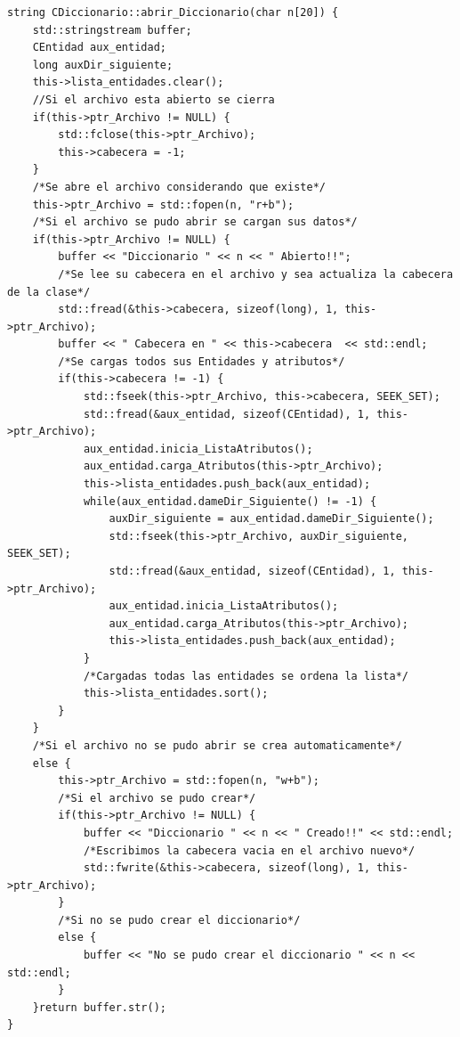 \newpage
{}
\begin{lstlisting}[frame=single]
string CDiccionario::abrir_Diccionario(char n[20]) {
    std::stringstream buffer;
    CEntidad aux_entidad;
    long auxDir_siguiente;
    this->lista_entidades.clear();
    //Si el archivo esta abierto se cierra
    if(this->ptr_Archivo != NULL) {
        std::fclose(this->ptr_Archivo);
        this->cabecera = -1;
    }
    /*Se abre el archivo considerando que existe*/
    this->ptr_Archivo = std::fopen(n, "r+b");
    /*Si el archivo se pudo abrir se cargan sus datos*/
    if(this->ptr_Archivo != NULL) {
        buffer << "Diccionario " << n << " Abierto!!";
        /*Se lee su cabecera en el archivo y sea actualiza la cabecera de la clase*/
        std::fread(&this->cabecera, sizeof(long), 1, this->ptr_Archivo);
        buffer << " Cabecera en " << this->cabecera  << std::endl;
        /*Se cargas todos sus Entidades y atributos*/
        if(this->cabecera != -1) {
            std::fseek(this->ptr_Archivo, this->cabecera, SEEK_SET);
            std::fread(&aux_entidad, sizeof(CEntidad), 1, this->ptr_Archivo);
            aux_entidad.inicia_ListaAtributos();
            aux_entidad.carga_Atributos(this->ptr_Archivo);
            this->lista_entidades.push_back(aux_entidad);
            while(aux_entidad.dameDir_Siguiente() != -1) {
                auxDir_siguiente = aux_entidad.dameDir_Siguiente();
                std::fseek(this->ptr_Archivo, auxDir_siguiente, SEEK_SET);
                std::fread(&aux_entidad, sizeof(CEntidad), 1, this->ptr_Archivo);
                aux_entidad.inicia_ListaAtributos();
                aux_entidad.carga_Atributos(this->ptr_Archivo);
                this->lista_entidades.push_back(aux_entidad);
            }
            /*Cargadas todas las entidades se ordena la lista*/
            this->lista_entidades.sort();
        }
    }
    /*Si el archivo no se pudo abrir se crea automaticamente*/
    else {
        this->ptr_Archivo = std::fopen(n, "w+b");
        /*Si el archivo se pudo crear*/
        if(this->ptr_Archivo != NULL) {
        	buffer << "Diccionario " << n << " Creado!!" << std::endl;
            /*Escribimos la cabecera vacia en el archivo nuevo*/
            std::fwrite(&this->cabecera, sizeof(long), 1, this->ptr_Archivo);
        }
        /*Si no se pudo crear el diccionario*/
        else {
            buffer << "No se pudo crear el diccionario " << n << std::endl;
        }
    }return buffer.str();
}
\end{lstlisting}

